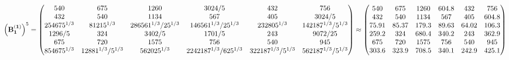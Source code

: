 \documentclass[10pt,a4paper]{article}
\begin{document}
	\[
		\left(\bold{B_1^{(1)}}\right)^{5} = 
		\begin{pmatrix}
			{{540}}{} & {{675}}{} & {{1260}}{} & {{3024}} / {{5}} & {{432}}{} & {{756}}{} \\
			{{432}}{} & {{540}}{} & {{1134}}{} & {{567}}{} & {{405}}{} & {{3024}} / {{5}} \\
			{{2}{54675^ {1 / 3}}}{} & {{8}{1215^ {1 / 3}}}{} & {{28}{6561^ {1 / 3}}} / {{25^ {1 / 3}}} & {{14}{6561^ {1 / 3}}} / {{25^ {1 / 3}}} & {{2}{32805^ {1 / 3}}}{} & {{14}{2187^ {1 / 3}}} / {{5^ {1 / 3}}} \\
			{{1296}} / {{5}} & {{324}}{} & {{3402}} / {{5}} & {{1701}} / {{5}} & {{243}}{} & {{9072}} / {{25}} \\
			{{675}}{} & {{720}}{} & {{1575}}{} & {{756}}{} & {{540}}{} & {{945}}{} \\
			{{8}{54675^ {1 / 3}}}{} & {{128}{81^ {1 / 3}}} / {{5^ {1 / 3}}} & {{56}{2025^ {1 / 3}}}{} & {{224}{2187^ {1 / 3}}} / {{625^ {1 / 3}}} & {{32}{2187^ {1 / 3}}} / {{5^ {1 / 3}}} & {{56}{2187^ {1 / 3}}} / {{5^ {1 / 3}}} \\
		\end{pmatrix}
		\approx
		\begin{pmatrix}
			540      & 675      & 1260     & 604.8    & 432      & 756      \\
			432      & 540      & 1134     & 567      & 405      & 604.8    \\
			75.91    & 85.37    & 179.3    & 89.63    & 64.02    & 106.3    \\
			259.2    & 324      & 680.4    & 340.2    & 243      & 362.9    \\
			675      & 720      & 1575     & 756      & 540      & 945      \\
			303.6    & 323.9    & 708.5    & 340.1    & 242.9    & 425.1    \\
		\end{pmatrix}
	\]
\end{document}
